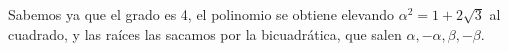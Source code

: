 \begin{ejercicio}
\begin{enumerate}
            Sabemos ya que el grado es 4, el polinomio se obtiene elevando $\alpha^2=1+2\sqrt{3}$ al cuadrado, y las raíces las sacamos por la bicuadrática, que salen $\alpha,-\alpha,\beta,-\beta$.
    \end{enumerate}
\end{ejercicio}